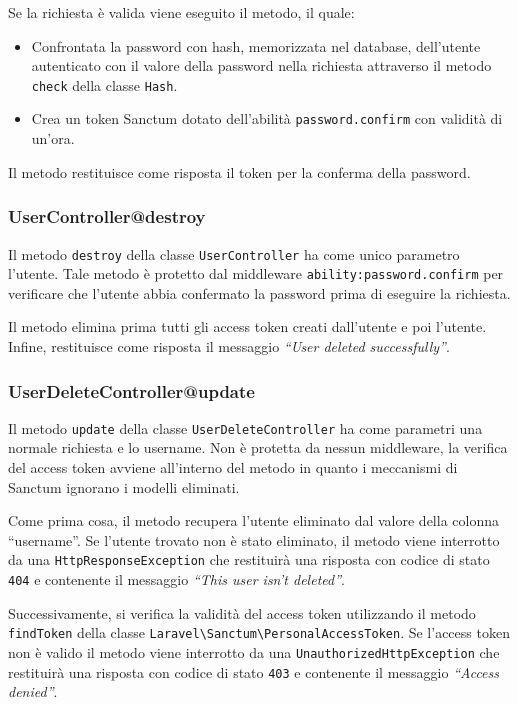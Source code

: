 Se la richiesta \`e valida viene eseguito il metodo, il quale:
\begin{itemize}
	\item Confrontata la password con hash, memorizzata nel database, dell'utente autenticato con il valore della password nella richiesta attraverso il metodo \verb|check| della classe \verb|Hash|.
	\item Crea un token Sanctum dotato dell'abilit\`a \verb|password.confirm| con validit\`a di un'ora.
\end{itemize} 

Il metodo restituisce come risposta il token per la conferma della password.

\subsubsection{UserController@destroy}
Il metodo \verb|destroy| della classe \verb|UserController| ha come unico parametro l'utente. Tale metodo \`e protetto dal middleware \verb|ability:password.confirm| per verificare che l'utente abbia confermato la password prima di eseguire la richiesta.

Il metodo elimina prima tutti gli access token creati dall'utente e poi l'utente. Infine, restituisce come risposta il messaggio \textit{``User deleted successfully''}.

\subsubsection{UserDeleteController@update}
Il metodo \verb|update| della classe \verb|UserDeleteController| ha come parametri una normale richiesta e lo username. Non \`e protetta da nessun middleware, la verifica del access token avviene all'interno del metodo in quanto i meccanismi di Sanctum ignorano i modelli eliminati. 

Come prima cosa, il metodo recupera l'utente eliminato dal valore della colonna ``username''. Se l'utente trovato non \`e stato eliminato, il metodo  viene interrotto da una
\verb|HttpResponseException| che restituir\`a una risposta con codice di stato \verb|404| e contenente il messaggio \textit{``This user isn't deleted''}.

Successivamente, si verifica la validit\`a del access token utilizzando il metodo \verb|findToken| della classe \verb|Laravel\Sanctum\PersonalAccessToken|. Se l'access token non \`e valido il metodo viene interrotto da una \verb|UnauthorizedHttpException| che restituir\`a una risposta con codice di stato \verb|403| e contenente il messaggio \textit{``Access denied''}.

